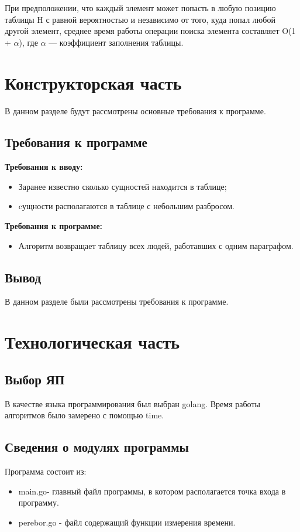 \documentclass[12pt]{report}
\begin{document}
При предположении, что каждый элемент может попасть в любую позицию таблицы H с равной вероятностью и независимо от того, куда попал любой другой элемент, среднее время работы операции поиска элемента составляет O(1 + $\alpha$), где $\alpha$ — коэффициент заполнения таблицы.

\chapter{Конструкторская часть}
В данном разделе будут рассмотрены основные требования к программе.

\section{Требования к программе}
\textbf{Требования к вводу:}
\begin{itemize}
	\item Заранее известно сколько сущностей находится в таблице;
	\item cущности располагаются в таблице с небольшим разбросом.
\end{itemize}

\textbf{Требования к программе:}
\begin{itemize}
	\item Алгоритм возвращает таблицу всех людей, работавших с одним параграфом.
\end{itemize}


\section*{Вывод}
В данном разделе были рассмотрены требования к программе.


\chapter{Технологическая часть}

\section{Выбор ЯП}
В качестве языка программирования был выбран golang.
Время работы алгоритмов было замерено с помощью time. 
\section{Сведения о модулях программы}
Программа состоит из:
\begin{itemize}
	\item main.go- главный файл программы, в котором располагается точка входа в программу.
	\item perebor.go - файл содержащий функции измерения времени.
\end{itemize}
\end{document}
